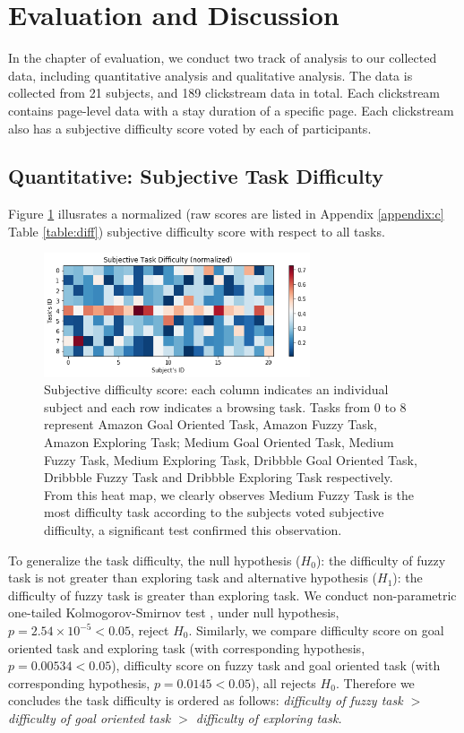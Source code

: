 \section{Evaluation and Discussion}
\label{ch:eval}

In the chapter of evaluation, we conduct two track of analysis to our collected data, including
quantitative analysis and qualitative analysis. The data is collected from 21 subjects, 
and 189 clickstream data in total. Each clickstream contains page-level data with a stay duration
of a specific page. Each clickstream also has a subjective difficulty score voted by each 
of participants.

\subsection{Quantitative: Subjective Task Difficulty}

Figure \ref{fig:difficulty} illusrates a normalized (raw scores are listed in 
Appendix \ref{appendix:c} Table \ref{table:diff}) subjective difficulty score 
with respect to all tasks.

\begin{figure}[H]
    \centering
    \includegraphics[width=0.7\textwidth]{figures/difficulty}
    \caption{Subjective difficulty score: each column indicates an individual subject and
    each row indicates a browsing task. Tasks from 0 to 8 represent Amazon Goal Oriented Task,
    Amazon Fuzzy Task, Amazon Exploring Task; Medium Goal Oriented Task, Medium Fuzzy Task,
    Medium Exploring Task, Dribbble Goal Oriented Task, Dribbble Fuzzy Task and Dribbble Exploring Task
    respectively.
    From this heat map, we clearly observes Medium Fuzzy Task is the most difficulty task
    according to the subjects voted subjective difficulty, a significant test confirmed this observation.}
    \label{fig:difficulty}
\end{figure}

To generalize the task difficulty, the null hypothesis ($H_0$): the difficulty of fuzzy task is not greater
than exploring task and alternative hypothesis ($H_1$): the difficulty of fuzzy task is greater than
exploring task. We conduct non-parametric one-tailed Kolmogorov-Smirnov test
\cite{massey1951kolmogorov}, under null hypothesis, $p=2.54\times 10^{-5} < 0.05$, reject $H_0$.
Similarly, we compare difficulty score on goal oriented task and exploring task (with corresponding hypothesis, 
$p=0.00534 < 0.05$), difficulty score on fuzzy task and goal oriented task (with corresponding hypothesis, 
$p=0.0145 < 0.05$), all rejects $H_0$. Therefore we concludes the task difficulty is ordered
as follows: \emph{difficulty of fuzzy task $>$ difficulty of goal oriented task $>$ difficulty of exploring task.}


